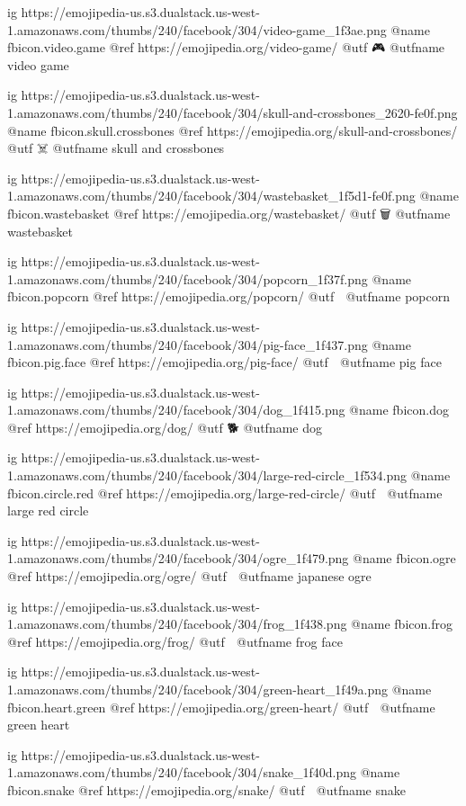   ig https://emojipedia-us.s3.dualstack.us-west-1.amazonaws.com/thumbs/240/facebook/304/video-game_1f3ae.png
  @name fbicon.video.game
  @ref https://emojipedia.org/video-game/
  @utf 🎮
  @utfname video game


  ig https://emojipedia-us.s3.dualstack.us-west-1.amazonaws.com/thumbs/240/facebook/304/skull-and-crossbones_2620-fe0f.png
  @name fbicon.skull.crossbones
  @ref https://emojipedia.org/skull-and-crossbones/
  @utf ☠️
  @utfname skull and crossbones

  ig https://emojipedia-us.s3.dualstack.us-west-1.amazonaws.com/thumbs/240/facebook/304/wastebasket_1f5d1-fe0f.png
  @name fbicon.wastebasket
  @ref https://emojipedia.org/wastebasket/
  @utf 🗑
  @utfname wastebasket

  ig https://emojipedia-us.s3.dualstack.us-west-1.amazonaws.com/thumbs/240/facebook/304/popcorn_1f37f.png
  @name fbicon.popcorn
  @ref https://emojipedia.org/popcorn/
  @utf 🍿
  @utfname popcorn

  ig https://emojipedia-us.s3.dualstack.us-west-1.amazonaws.com/thumbs/240/facebook/304/pig-face_1f437.png
  @name fbicon.pig.face
  @ref https://emojipedia.org/pig-face/
  @utf 🐷
  @utfname pig face

  ig https://emojipedia-us.s3.dualstack.us-west-1.amazonaws.com/thumbs/240/facebook/304/dog_1f415.png
  @name fbicon.dog
  @ref https://emojipedia.org/dog/
  @utf 🐕
  @utfname dog

  ig https://emojipedia-us.s3.dualstack.us-west-1.amazonaws.com/thumbs/240/facebook/304/large-red-circle_1f534.png
  @name fbicon.circle.red
  @ref https://emojipedia.org/large-red-circle/
  @utf 🔴
  @utfname large red circle

  ig https://emojipedia-us.s3.dualstack.us-west-1.amazonaws.com/thumbs/240/facebook/304/ogre_1f479.png
  @name fbicon.ogre
  @ref https://emojipedia.org/ogre/
  @utf 👹
  @utfname japanese ogre

  ig https://emojipedia-us.s3.dualstack.us-west-1.amazonaws.com/thumbs/240/facebook/304/frog_1f438.png
  @name fbicon.frog
  @ref https://emojipedia.org/frog/
  @utf 🐸
  @utfname frog face

  ig https://emojipedia-us.s3.dualstack.us-west-1.amazonaws.com/thumbs/240/facebook/304/green-heart_1f49a.png
  @name fbicon.heart.green 
  @ref https://emojipedia.org/green-heart/
  @utf 💚
  @utfname green heart

  ig https://emojipedia-us.s3.dualstack.us-west-1.amazonaws.com/thumbs/240/facebook/304/snake_1f40d.png
  @name fbicon.snake
  @ref https://emojipedia.org/snake/
  @utf 🐍
  @utfname snake

